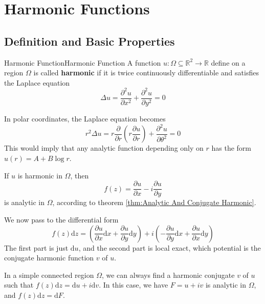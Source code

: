 \documentclass[../main.tex]{subfiles}
\begin{document}
\section{Harmonic Functions}
\subsection{Definition and Basic Properties}
\begin{definition}{Harmonic Function}{Harmonic Function}
	A function $u: \Omega \subseteq \mathbb{R}^2 \rightarrow \mathbb{R}$ define on a region $\Omega$ is called \textbf{harmonic} if it is twice continuously differentiable and satisfies the Laplace equation
	\begin{equation}
		\Delta u = \frac{\partial^2 u}{\partial x^2} + \frac{\partial^2 u}{\partial y^2} = 0
	\end{equation}
\end{definition}
In polar coordinates, the Laplace equation becomes
\begin{equation}
	r^2 \Delta u = r \frac{\partial}{\partial r} \left( r \frac{\partial u}{\partial r} \right) + \frac{\partial^2 u}{\partial \theta^2} = 0
\end{equation}
This would imply that any analytic function depending only on $r$ has the form $u(r) = A + B \log r$.

If $u$ is harmonic in $\Omega$, then
\begin{equation}
	f(z) = \frac{\partial u}{\partial x} - i \frac{\partial u}{\partial y}
\end{equation}
is analytic in $\Omega$, according to theorem \ref{thm:Analytic And Conjugate Harmonic}.

We now pass to the differential form
\begin{equation*}
	f(z)\mathrm{d} z = \left(\frac{\partial u}{\partial x} \mathrm{d} x + \frac{\partial u}{\partial y} \mathrm{d} y\right) + i \left(-\frac{\partial u}{\partial y} \mathrm{d} x + \frac{\partial u}{\partial x} \mathrm{d} y\right)
\end{equation*}
The first part is just $\mathrm{d} u$, and the second part is local exact, which potential is the conjugate harmonic function $v$ of $u$. 
\begin{remark}
	In a simple connected region $\Omega$, we can always find a harmonic conjugate $v$ of $u$ such that $f(z) \mathrm{d} z = \mathrm{d} u + i \mathrm{d} v$. In this case, we have $F=u+iv$ is analytic in $\Omega$, and $f(z) \mathrm{d} z = \mathrm{d} F$.
\end{remark}
\end{document}
